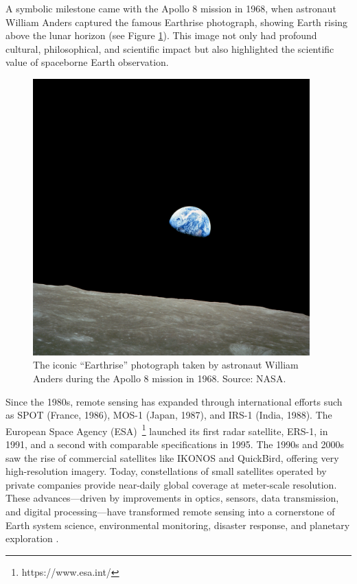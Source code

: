 A symbolic milestone came with the Apollo 8 mission in 1968, when astronaut William Anders captured the famous Earthrise photograph, showing Earth rising above the lunar horizon (see Figure \ref{fig:earthrise}). This image not only had profound cultural, philosophical, and scientific impact but also highlighted the scientific value of spaceborne Earth observation.
\begin{figure}[!htbp]
  \centering
  \includegraphics[width=0.95\textwidth]{img/earthrise.jpg}
  \caption[“Earthrise” photograph (Apollo 8, 1968)]{The iconic “Earthrise” photograph taken by astronaut William Anders during the Apollo 8 mission in 1968. Source: NASA.}
  \label{fig:earthrise}
\end{figure}
Since the 1980s, remote sensing has expanded through international efforts such as SPOT (France, 1986), MOS-1 (Japan, 1987), and IRS-1 (India, 1988). The European Space Agency (ESA)~\footnote{https://www.esa.int/} launched its first radar satellite, ERS-1, in 1991, and a second with comparable specifications in 1995. The 1990s and 2000s saw the rise of commercial satellites like IKONOS and QuickBird, offering very high-resolution imagery. Today, constellations of small satellites operated by private companies provide near-daily global coverage at meter-scale resolution. These advances—driven by improvements in optics, sensors, data transmission, and digital processing—have transformed remote sensing into a cornerstone of Earth system science, environmental monitoring, disaster response, and planetary exploration \cite{book_Satellite_RS}.

